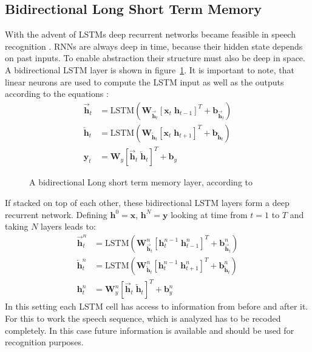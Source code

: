 \subsection{Bidirectional Long Short Term Memory}
With the advent of LSTMs deep recurrent networks became feasible in speech recognition \cite{Graves2013b}. RNNs are always deep in time, because their hidden state depends on past inputs. To enable abstraction their structure must also be deep in space. A bidirectional LSTM layer is shown in figure~\ref{fig:blstm}. It is important to note, that linear neurons are used to compute the LSTM input as well as the outputs according to the equations \cite{Graves2013b}:
\begin{align}
\overrightarrow{\mathbf{h}}_t &= \text{LSTM}(\mathbf{W}_{\overrightarrow{\mathbf{h}}_t} [\mathbf{x}_t \; \mathbf{h}_{t-1}]^T + \mathbf{b}_{\overrightarrow{\mathbf{h}}_t}) 
\\
\overleftarrow{\mathbf{h}}_t &= \text{LSTM}(\mathbf{W}_{\overleftarrow{\mathbf{h}}_t} [\mathbf{x}_t \; \mathbf{h}_{t+1}]^T + \mathbf{b}_{\overleftarrow{\mathbf{h}}_t})
\\
\mathbf{y}_t &= \mathbf{W}_{y} [\overrightarrow{\mathbf{h}}_t \; \overleftarrow{\mathbf{h}}_t]^T + \mathbf{b}_y  
\end{align}
\begin{figure}
\centering

\caption{A bidirectional Long short term memory layer, according to \cite{Graves2013b} }
\label{fig:blstm}
\end{figure}
If stacked on top of each other, these bidirectional LSTM layers form a deep recurrent network. Defining $\mathbf{h}^0 = \mathbf{x}$, $\mathbf{h}^N = \mathbf{y}$ looking at time from $t = 1$ to $T$ and taking $N$ layers leads to:
\begin{align}
\overrightarrow{\mathbf{h}}_t^n &= \text{LSTM}(\mathbf{W}_{\overrightarrow{\mathbf{h}}_t}^n [\mathbf{h}_t^{n-1} \; \mathbf{h}_{t-1}^n]^T + \mathbf{b}_{\overrightarrow{\mathbf{h}}_t}^n) 
\\
\overleftarrow{\mathbf{h}}_t^n &= \text{LSTM}(\mathbf{W}_{\overleftarrow{\mathbf{h}}_t}^n [\mathbf{h}_t^{n-1} \; \mathbf{h}_{t+1}^n]^T + \mathbf{b}_{\overleftarrow{\mathbf{h}}_t}^n)
\\
\mathbf{h}_t^n &= \mathbf{W}_{y}^n [\overrightarrow{\mathbf{h}}_t \; \overleftarrow{\mathbf{h}}_t]^T + \mathbf{b}_y^n
\end{align}
In this setting each LSTM cell has access to information from before and after it. For this to work the speech sequence, which is analyzed has to be recoded completely. In this case future information is available and should be used for recognition purposes.

